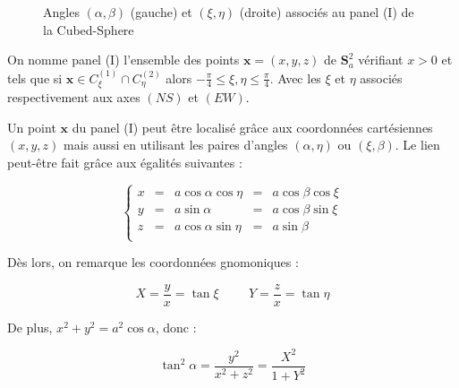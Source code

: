 \begin{figure}
\begin{center}
\caption{Angles $(\alpha, \beta)$ (gauche) et $(\xi,\eta)$ (droite) associés au panel (I) de la Cubed-Sphere}
\label{fig:coord cs}
\end{center}
\end{figure}


\begin{definition}
On nomme panel (I) l'ensemble des points $\mathbf{x}=(x,y,z)$ de $\mathbf{S}_a^2$ vérifiant $x>0$ et tels que si $\mathbf{x} \in C_{\xi}^{(1)} \cap C_{\eta}^{(2)}$ alors $-\frac{\pi}{4}\leq \xi,\eta \leq \frac{\pi}{4}$. Avec les $\xi$ et $\eta$ associés respectivement aux axes $(NS)$ et $(EW)$.
\end{definition}

Un point $\mathbf{x}$ du panel (I) peut être localisé grâce aux coordonnées cartésiennes $(x,y,z)$ mais aussi en utilisant les paires d'angles $(\alpha, \eta)$ ou $(\xi, \beta)$. Le lien peut-être fait grâce aux égalités suivantes :

\begin{equation}
\left\lbrace
\begin{array}{rcccc}
x & = & a \cos \alpha \cos \eta & = & a \cos \beta \cos \xi \\
y & = & a \sin \alpha & = & a \cos \beta \sin \xi \\
z & = & a \cos \alpha \sin \eta & = & a \sin \beta \\
\end{array}
\right.
\end{equation}

Dès lors, on remarque les coordonnées gnomoniques :

\begin{equation}
X=\dfrac{y}{x}=\tan \xi \hspace{1cm} Y = \dfrac{z}{x} = \tan \eta
\end{equation}

De plus, $x^2+y^2=a^2 \cos \alpha$, donc :

\begin{equation}
\tan^2 \alpha = \dfrac{y^2}{x^2+z^2} = \dfrac{X^2}{1+Y^2}
\end{equation}

